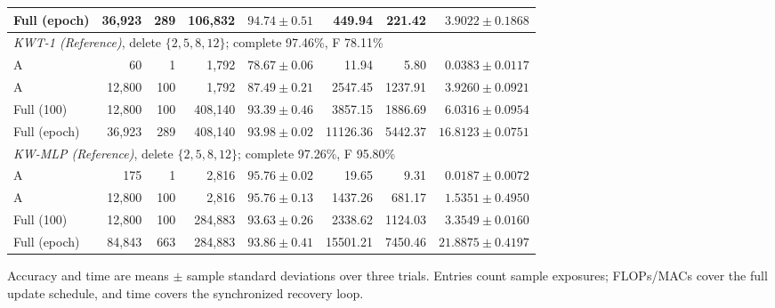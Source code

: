 \begin{table}[htbp]
\begin{tabular*}{\linewidth}{@{\extracolsep{\fill}}lrrrrrrr@{}}
Full (epoch) & 36,923 & 289 & 106,832 & $94.74\pm0.51$ & 449.94 & 221.42 & $3.9022\pm0.1868$ \\
\midrule
\multicolumn{8}{l}{\textit{KWT-1 (Reference)}, delete $\{2,5,8,12\}$; complete 97.46\%, F 78.11\%} \\
A & 60 & 1 & 1,792 & $78.67\pm0.06$ & 11.94 & 5.80 & $0.0383\pm0.0117$ \\
A & 12,800 & 100 & 1,792 & $87.49\pm0.21$ & 2547.45 & 1237.91 & $3.9260\pm0.0921$ \\
Full (100) & 12,800 & 100 & 408,140 & $93.39\pm0.46$ & 3857.15 & 1886.69 & $6.0316\pm0.0954$ \\
Full (epoch) & 36,923 & 289 & 408,140 & $93.98\pm0.02$ & 11126.36 & 5442.37 & $16.8123\pm0.0751$ \\
\midrule
\multicolumn{8}{l}{\textit{KW-MLP (Reference)}, delete $\{2,5,8,12\}$; complete 97.26\%, F 95.80\%} \\
A & 175 & 1 & 2,816 & $95.76\pm0.02$ & 19.65 & 9.31 & $0.0187\pm0.0072$ \\
A & 12,800 & 100 & 2,816 & $95.76\pm0.13$ & 1437.26 & 681.17 & $1.5351\pm0.4950$ \\
Full (100) & 12,800 & 100 & 284,883 & $93.63\pm0.26$ & 2338.62 & 1124.03 & $3.3549\pm0.0160$ \\
Full (epoch) & 84,843 & 663 & 284,883 & $93.86\pm0.41$ & 15501.21 & 7450.46 & $21.8875\pm0.4197$ \\
\bottomrule
\end{tabular*}
\par\smallskip\begin{minipage}{\linewidth}\footnotesize
Accuracy and time are means $\pm$ sample standard deviations over three trials. Entries count sample exposures; FLOPs/MACs cover the full update schedule, and time covers the synchronized recovery loop.
\end{minipage}
\end{table}
